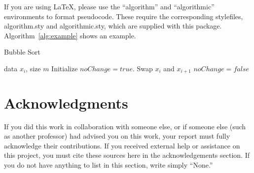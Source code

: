 \documentclass{article}
\begin{document}
If you are using \LaTeX, please use the ``algorithm'' and ``algorithmic'' 
environments to format pseudocode. These require 
the corresponding stylefiles, algorithm.sty and 
algorithmic.sty, which are supplied with this package. 
Algorithm~\ref{alg:example} shows an example. 

\begin{algorithm}[tb]
   \caption{Bubble Sort}
   \label{alg:example}
\begin{algorithmic}
    data $x_i$, size $m$
   \REPEAT
   \STATE Initialize $noChange = true$.
   \STATE Swap $x_i$ and $x_{i+1}$
   \STATE $noChange = false$
   \ENDIF
   \ENDFOR
\end{algorithmic}
\end{algorithm}
\section*{Acknowledgments} 
 
If you did this work in collaboration with someone else, or if someone else (such as another
professor) had advised you on this work, your report must fully acknowledge their contributions. If you received external help or assistance on this project, you must cite these sources here in the acknowledgements section.  If you do not have anything to list in this section, write simply ``None.''



\end{document}
